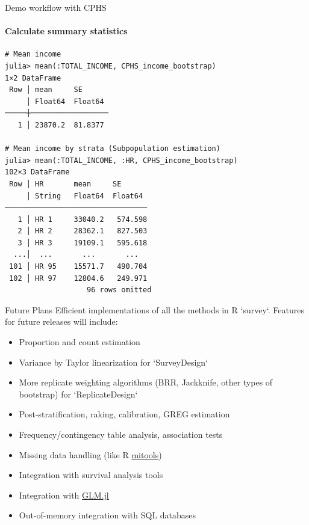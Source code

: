 \documentclass{beamer}          %
\begin{document}
\begin{frame}[fragile]{Demo workflow with CPHS}
\framesubtitle{Calculate summary statistics}
\begin{verbatim}
# Mean income
julia> mean(:TOTAL_INCOME, CPHS_income_bootstrap) 
1×2 DataFrame
 Row │ mean     SE      
     │ Float64  Float64 
─────┼──────────────────
   1 │ 23870.2  81.8377

# Mean income by strata (Subpopulation estimation)
julia> mean(:TOTAL_INCOME, :HR, CPHS_income_bootstrap)
102×3 DataFrame
 Row │ HR       mean     SE       
     │ String   Float64  Float64  
─────────────────────────────────
   1 │ HR 1     33040.2   574.598
   2 │ HR 2     28362.1   827.503
   3 │ HR 3     19109.1   595.618
  ...│  ...       ...       ...
 101 │ HR 95    15571.7   490.704
 102 │ HR 97    12804.6   249.971
                   96 rows omitted
\end{verbatim}
\end{frame}



\begin{frame}{Future Plans}
	Efficient implementations of all the methods in R `survey`. Features for future releases will include:
	\begin{itemize}
		\item Proportion and count estimation
		\item Variance by Taylor linearization for `SurveyDesign`
		\item More replicate weighting algorithms (BRR, Jackknife, other types of bootstrap) for `ReplicateDesign`
		\item Post-stratification, raking, calibration, GREG estimation
		\item Frequency/contingency table analysis, association tests
		\item Missing data handling (like R \href{https://cran.r-project.org/web/packages/mitools/index.html}{mitools})
		\item Integration with survival analysis tools
		\item Integration with \href{https://github.com/JuliaStats/GLM.jl}{GLM.jl}
		\item Out-of-memory integration with SQL databases
	\end{itemize}
\end{frame}
\end{document}
